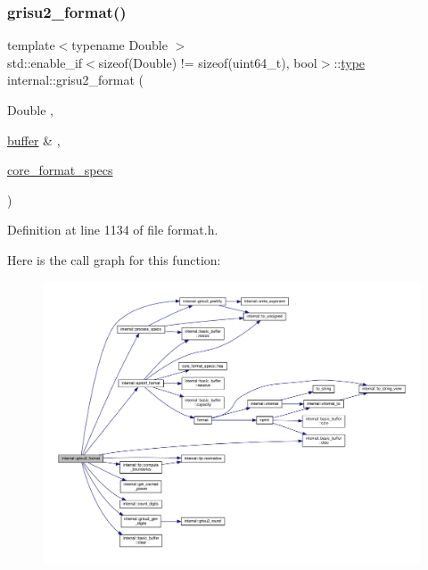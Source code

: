 \subsubsection{\texorpdfstring{grisu2\+\_\+format()}{grisu2\_format()}\hspace{0.1cm}{\footnotesize\ttfamily [3/3]}}
{\footnotesize\ttfamily template$<$typename Double $>$ \\
std\+::enable\+\_\+if$<$sizeof(Double) != sizeof(uint64\+\_\+t), bool$>$\+::\hyperlink{namespaceinternal_a8661864098ac0acff9a6dd7e66f59038}{type} internal\+::grisu2\+\_\+format (\begin{DoxyParamCaption}\item[{Double}]{,  }\item[{\hyperlink{namespaceinternal_a5fcdbc3efad1f390e6c3f0fdafa56122}{buffer} \&}]{,  }\item[{\hyperlink{structcore__format__specs}{core\+\_\+format\+\_\+specs}}]{ }\end{DoxyParamCaption})\hspace{0.3cm}{\ttfamily [inline]}}



Definition at line 1134 of file format.\+h.

Here is the call graph for this function\+:
\nopagebreak
\begin{figure}[H]
\begin{center}
\leavevmode
\includegraphics[width=350pt]{namespaceinternal_aa6ca58c625a66aa96f3839eb3bfe2f6e_cgraph}
\end{center}
\end{figure}
\mbox{\label{namespaceinternal_a654d8a0809bb6e5db2deacf15b2971a2}} 
